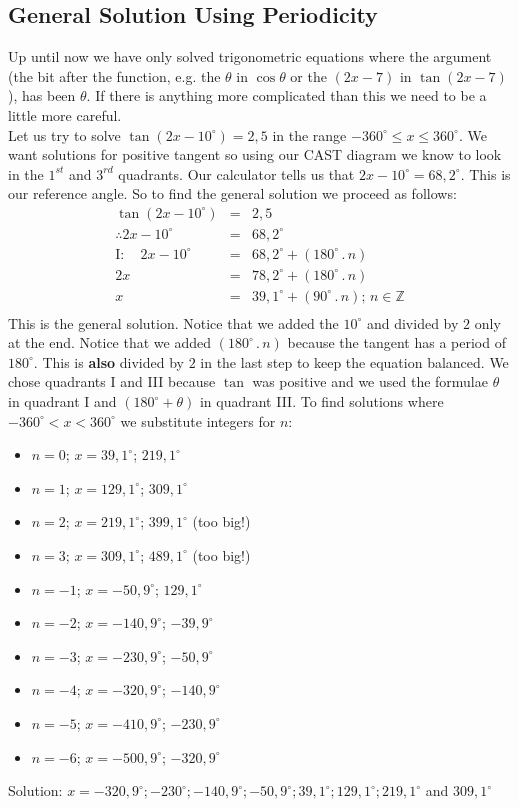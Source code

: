 \subsection{General Solution Using Periodicity}
Up until now we have only solved trigonometric equations where the argument (the bit after the function, e.g.\@{} the $\theta$ in $\cos\theta$ or the $(2x-7)$ in $\tan(2x-7)$), has been $\theta$. If there is anything more complicated than this we need to be a little more careful. \\
\newline
Let us try to solve $\tan(2x-10^\circ)=2,5$ in the range $-360^\circ \leq x \leq 360^\circ$. We want solutions for positive tangent so using our CAST diagram we know to look in the $1^{st}$ and $3^{rd}$ quadrants. Our calculator tells us that $2x-10^\circ=68,2^\circ$. This is our reference angle. So to find the general solution we proceed as follows:
 \begin{eqnarray*}
 \tan(2x-10^{\circ}) &=& 2,5\\
 \therefore 2x-10^\circ &=& 68,2^{\circ}\\
 \mathrm{I:} \quad 2x-10^{\circ}&=&68,2^{\circ}+(180^{\circ}\,.\, n)\\ 2x&=&78,2^{\circ}+(180^{\circ}\,.\, n)\\
 x&=&39,1^{\circ}+(90^{\circ}\,.\, n)\mbox{; }n \in \mathbb{Z} \\
\end{eqnarray*}
This is the general solution. Notice that we added the $10^{\circ}$
and divided by $2$ only at the end. Notice that we added
$(180^{\circ}\,.\, n)$ because the tangent has a period of
$180^{\circ}$. This is \textbf{also} divided by $2$ in the last step
to keep the equation balanced. We chose quadrants I and III because
$\tan$ was positive and we used the formulae $\theta$ in quadrant I
and $(180^{\circ}+\theta)$ in quadrant III. To find solutions where
$-360^{\circ}<x<360^{\circ}$ we substitute integers for $n$:
\begin{itemize} 
\item $n=0$; $x=39,1^{\circ}$; $219,1^{\circ}$
\item $n=1$; $x=129,1^{\circ}$; $309,1^{\circ}$
\item $n=2$; $x=219,1^{\circ}$; $399,1^{\circ}$ (too big!)
\item $n=3$; $x=309,1^{\circ}$; $489,1^{\circ}$ (too big!)
\item $n=-1$; $x=-50,9^{\circ}$; $129,1^{\circ}$
\item $n=-2$; $x=-140,9^{\circ}$; $-39,9^{\circ}$
\item $n=-3$; $x=-230,9^{\circ}$; $-50,9^{\circ}$
\item $n=-4$; $x=-320,9^{\circ}$; $-140,9^{\circ}$
\item $n=-5$; $x=-410,9^{\circ}$; $-230,9^{\circ}$
\item $n=-6$; $x=-500,9^{\circ}$; $-320,9^{\circ}$
\end{itemize} 
Solution: $x=-320,9^{\circ}; -230^{\circ}; -140,9^{\circ}; -50,9^{\circ}; 39,1^{\circ}; 129,1^{\circ}; 219,1^{\circ}$ and $309,1^{\circ}$

